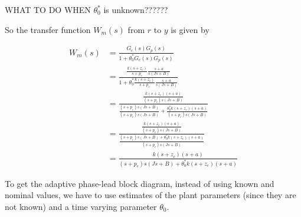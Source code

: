 WHAT TO DO WHEN $\theta_{0}^{*}$ is unknown??????

So the transfer function $W_{m}(s)$ from $r$ to $y$ is given by

\begin{align*}
  W_{m}(s)&=\frac{G_{c}(s)G_{p}(s)}{1+\theta_{0}^{*}G_{c}(s)G_{p}(s)} \\
  &=\frac{\frac{k(s+z_{c})}{s+p_{c}}\frac{s+a}{s(Js+B)}}{1+\theta_{0}^{*}\frac{k(s+z_{c})}{s+p_{c}}\frac{s+a}{s(Js+B)}} \\
  &=\frac{\frac{k(s+z_{c})(s+a)}{(s+p_{c})s(Js+B)}}{\frac{(s+p_{c})s(Js+B)}{(s+p_{c})s(Js+B)}+\frac{\theta_{0}^{*}k(s+z_{c})(s+a)}{(s+p_{c})s(Js+B)}} \\
  &=\frac{\frac{k(s+z_{c})(s+a)}{(s+p_{c})s(Js+B)}}{\frac{(s+p_{c})s(Js+B)+\theta_{0}^{*}k(s+z_{c})(s+a)}{(s+p_{c})s(Js+B)}} \\
  &=\frac{k(s+z_{c})(s+a)}{(s+p_{c})s(Js+B)+\theta_{0}^{*}k(s+z_{c})(s+a)}
\end{align*}

To get the adaptive phase-lead block diagram, instead of using known and nominal values, we have to use estimates of the plant parameters (since they are not known) and a time varying parameter $\theta_{0}$.

